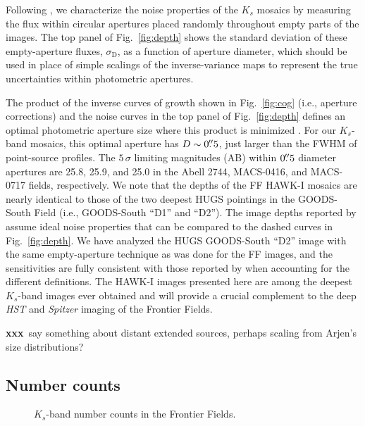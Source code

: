 \documentclass[iop, numberedappendix]{emulateapj}
\gdef\xxx{\textbf{xxx}}
\begin{document}
Following \cite{labbe:03} \citep[see also][]{quadri:musyc, whitaker:nmbs, skelton:14}, we characterize the noise properties of the $K_s$ mosaics by measuring the flux within circular apertures placed randomly throughout empty parts of the images.  The top panel of Fig.~\ref{fig:depth} shows the standard deviation of these empty-aperture fluxes, $\sigma_\mathrm{D}$, as a function of aperture diameter, which should be used in place of simple scalings of the inverse-variance maps to represent the true uncertainties within photometric apertures.  

The product of the inverse curves of growth shown in Fig.~\ref{fig:cog} (i.e., aperture corrections) and the noise curves in the top panel of Fig.~\ref{fig:depth} defines an optimal photometric aperture size where this product is minimized \citep{whitaker:nmbs}.  For our $K_s$-band mosaics, this optimal aperture has $D\sim0\mbox{$.\!\!^{\prime\prime}$}5$, just larger than the FWHM of point-source profiles.  The $5\,\sigma$ limiting magnitudes (AB) within $0\mbox{$.\!\!^{\prime\prime}$}5$ diameter apertures are 25.8, 25.9, and 25.0 in the Abell 2744, MACS-0416, and MACS-0717 fields, respectively.  We note that the depths of the FF HAWK-I mosaics are nearly identical to those of the two deepest HUGS pointings in the GOODS-South Field (i.e., GOODS-South ``D1'' and ``D2'').  The image depths reported by \cite{hugs} assume ideal noise properties that can be compared to the dashed curves in Fig.~\ref{fig:depth}.  We have analyzed the HUGS GOODS-South ``D2'' image with the same empty-aperture technique as was done for the FF images, and the sensitivities are fully consistent with those reported by \cite{hugs} when accounting for the different definitions.  The HAWK-I images presented here are among the deepest $K_s$-band images ever obtained and will provide a crucial complement to the deep \textit{HST} and \textit{Spitzer} imaging of the Frontier Fields.

\xxx\ say something about distant extended sources, perhaps scaling from Arjen's size distributions?

\subsection{Number counts}
\label{s:number}

\begin{figure*}
\caption{$K_s$-band number counts in the Frontier Fields. \label{fig:counts}}  
\end{figure*}
\end{document}
